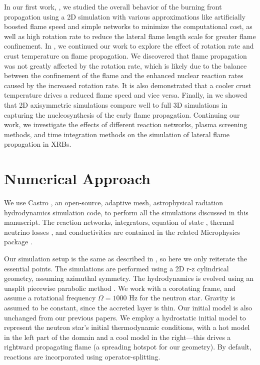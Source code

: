 \documentclass[preprint,times,tighten]{aastex631}
\newcommand{\castro}{{\sf Castro}}
\newcommand{\microphysics}{{\sf Microphysics}}
\begin{document}
In our first work, \cite{eiden:2020}, we studied the overall behavior of the burning front propagation using a 2D simulation with various approximations like artificially boosted flame speed and simple networks to minimize the computational cost, as well as high rotation rate to reduce the lateral flame length scale for greater flame confinement. In \cite{harpole:2021}, we continued our work to explore the effect of rotation rate and crust temperature on flame propagation. We discovered that flame propagation was not greatly affected by the rotation rate, which is likely due to the balance between the confinement of the flame and the enhanced nuclear reaction rates caused by the increased rotation rate. It is also demonstrated that a cooler crust temperature drives a reduced flame speed and vice versa. 
Finally, in \citet{xrb_flame_3d} we showed
that 2D axisymmetric simulations compare well to full 3D simulations in capturing the nucleosynthesis of the early flame propagation.
Continuing our work, we investigate the effects of different reaction networks, plasma screening methods, and time integration methods on the simulation of lateral flame propagation in XRBs. 

\section{Numerical Approach}\label{Sec:numerics}

We use {\castro} \citep{castro,castro_joss}, an open-source, adaptive mesh, astrophysical radiation hydrodynamics simulation code, to perform all the simulations discussed in this manuscript. The reaction networks,
integrators, equation of state \citep{timmes_swesty:2000}, thermal neutrino losses \citep{neutrino}, and conductivities
\cite{Timmes00} are contained in the related {\microphysics} package \citep{starkiller}. 

Our simulation setup is the same as described in \citep{eiden:2020, harpole:2021}, so here we only reiterate the essential points. The simulations are performed using a 2D r-z cylindrical geometry, assuming azimuthal symmetry. 
The hydrodynamics is evolved using an unsplit piecewise parabolic method \citep{ppm,ppmunsplit,millercolella:2002}.
We work with a corotating frame, and assume a rotational frequency $\Omega = 1000$ Hz for the neutron star.  Gravity is assumed to be constant, since the accreted layer is thin.  Our initial model is also unchanged from our previous papers.  We employ a hydrostatic initial model to represent the neutron star's initial thermodynamic conditions, with a hot model in the left part of the domain and a cool model in the right---this drives a rightward propagating flame (a spreading hotspot for our geometry).  By default, reactions are incorporated using
operator-splitting.
\end{document}

